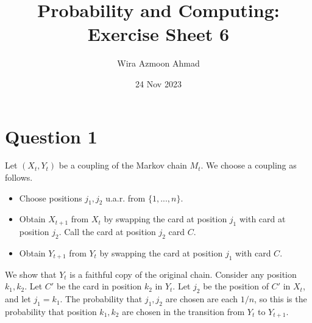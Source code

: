 \documentclass[11pt]{article} %
\title{Probability and Computing: \\Exercise Sheet 6}
\author{Wira Azmoon Ahmad}
\date{24 Nov 2023}
\begin{document}
%
\maketitle




\section*{Question 1}

Let $(X_t,Y_t)$ be a coupling of the Markov chain $M_t$.
We choose a coupling as follows.

\begin{itemize}
    \item Choose positions $j_1,j_2$ u.a.r. from $\{1,...,n\}$.
    \item Obtain $X_{t+1}$ from $X_t$ by swapping the card at position $j_1$ with card at position $j_2$.
    Call the card at position $j_2$ card $C$.
    \item Obtain $Y_{t+1}$ from $Y_t$ by swapping the card at position $j_1$ with card $C$.
\end{itemize}

We show that $Y_t$ is a faithful copy of the original chain.
Consider any position $k_1,k_2$. Let $C'$ be the card in position $k_2$ in $Y_t$.
Let $j_2$ be the position of $C'$ in $X_t$, and let $j_1=k_1$.
The probability that $j_1,j_2$ are chosen are each $1/n$, 
so this is the probability that position $k_1,k_2$ are chosen in the transition from $Y_t$ to $Y_{t+1}$.
\end{document}
